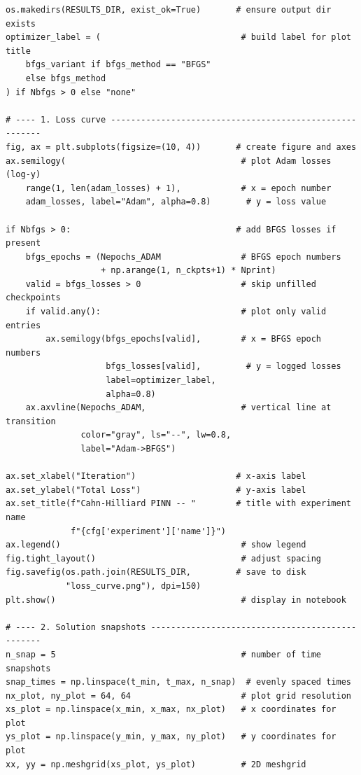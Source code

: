 \documentclass[11pt,a4paper]{article}
\begin{document}
\begin{lstlisting}
os.makedirs(RESULTS_DIR, exist_ok=True)       # ensure output dir exists
optimizer_label = (                            # build label for plot title
    bfgs_variant if bfgs_method == "BFGS"
    else bfgs_method
) if Nbfgs > 0 else "none"

# ---- 1. Loss curve --------------------------------------------------------
fig, ax = plt.subplots(figsize=(10, 4))       # create figure and axes
ax.semilogy(                                   # plot Adam losses (log-y)
    range(1, len(adam_losses) + 1),            # x = epoch number
    adam_losses, label="Adam", alpha=0.8)       # y = loss value

if Nbfgs > 0:                                 # add BFGS losses if present
    bfgs_epochs = (Nepochs_ADAM                # BFGS epoch numbers
                   + np.arange(1, n_ckpts+1) * Nprint)
    valid = bfgs_losses > 0                    # skip unfilled checkpoints
    if valid.any():                            # plot only valid entries
        ax.semilogy(bfgs_epochs[valid],        # x = BFGS epoch numbers
                    bfgs_losses[valid],         # y = logged losses
                    label=optimizer_label,
                    alpha=0.8)
    ax.axvline(Nepochs_ADAM,                   # vertical line at transition
               color="gray", ls="--", lw=0.8,
               label="Adam->BFGS")

ax.set_xlabel("Iteration")                    # x-axis label
ax.set_ylabel("Total Loss")                   # y-axis label
ax.set_title(f"Cahn-Hilliard PINN -- "        # title with experiment name
             f"{cfg['experiment']['name']}")
ax.legend()                                    # show legend
fig.tight_layout()                             # adjust spacing
fig.savefig(os.path.join(RESULTS_DIR,         # save to disk
            "loss_curve.png"), dpi=150)
plt.show()                                     # display in notebook

# ---- 2. Solution snapshots ------------------------------------------------
n_snap = 5                                     # number of time snapshots
snap_times = np.linspace(t_min, t_max, n_snap)  # evenly spaced times
nx_plot, ny_plot = 64, 64                      # plot grid resolution
xs_plot = np.linspace(x_min, x_max, nx_plot)   # x coordinates for plot
ys_plot = np.linspace(y_min, y_max, ny_plot)   # y coordinates for plot
xx, yy = np.meshgrid(xs_plot, ys_plot)         # 2D meshgrid


\end{lstlisting}
\end{document}
